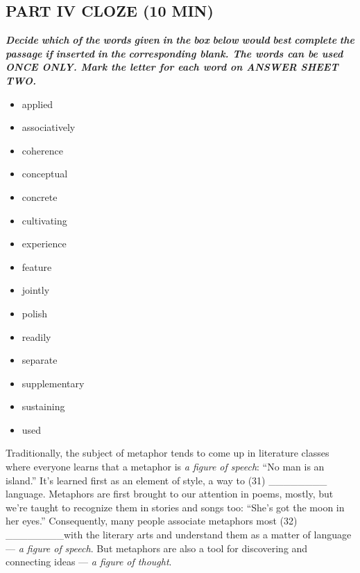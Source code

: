 \documentclass[UTF8,11pt]{ctexart}
\begin{document}
\subsection*{\textbf{PART IV} \textbf{CLOZE (10 MIN)}}


\textbf{\textit{Decide}} \textbf{\textit{which}} \textbf{\textit{of}} \textbf{\textit{the}} \textbf{\textit{words}} \textbf{\textit{given}} \textbf{\textit{in}} \textbf{\textit{the}} \textbf{\textit{box}} \textbf{\textit{below}} \textbf{\textit{would}} \textbf{\textit{best}} \textbf{\textit{complete}} \textbf{\textit{the}} \textbf{\textit{passage}} \textbf{\textit{if}} \textbf{\textit{inserted}} \textbf{\textit{in}} \textbf{\textit{the}} \textbf{\textit{corresponding blank. The words can be used ONCE ONLY. Mark the letter for each word on ANSWER SHEET TWO.}}


\begin{itemize}[leftmargin=2em,itemsep=.2em,topsep=.4em]\item[A.] applied
\item[B.] associatively
\item[C.] coherence
\item[D.] conceptual
\item[E.] concrete
\item[F.] cultivating
\item[G.] experience
\item[H.] feature
\item[I.] jointly
\item[J.] polish
\item[K.] readily
\item[L.] separate
\item[M.] supplementary
\item[N.] sustaining
\item[O.] used
\end{itemize}

Traditionally, the subject of metaphor tends to come up in literature classes where everyone learns that a metaphor is \textit{a figure of speech}: “No man is an island.” It’s learned first as an element of style, a way to (31) \_\_\_\_\_\_\_\_ language. Metaphors are first brought to our attention in poems, mostly, but we’re taught to recognize them in stories and songs too: “She’s got the moon in her eyes.” Consequently, many people associate metaphors most (32) \_\_\_\_\_\_\_\_with the literary arts and understand them as a matter of language — \textit{a figure of} \textit{speech}. But metaphors are also a tool for discovering and connecting ideas — \textit{a figure of thought}.
\end{document}
